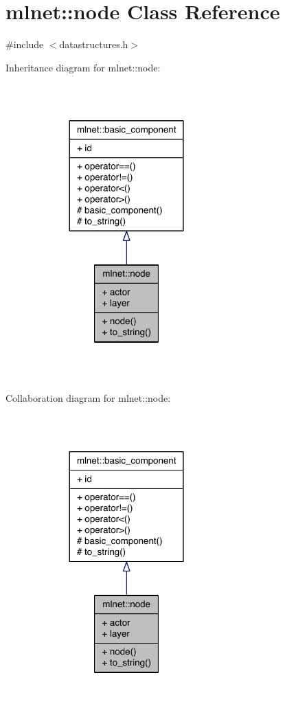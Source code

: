 \hypertarget{classmlnet_1_1node}{\section{mlnet\+:\+:node Class Reference}
\label{classmlnet_1_1node}
}


{\ttfamily \#include $<$datastructures.\+h$>$}



Inheritance diagram for mlnet\+:\+:node\+:\nopagebreak
\begin{figure}[H]
\begin{center}
\leavevmode
\includegraphics[width=204pt]{classmlnet_1_1node__inherit__graph}
\end{center}
\end{figure}


Collaboration diagram for mlnet\+:\+:node\+:\nopagebreak
\begin{figure}[H]
\begin{center}
\leavevmode
\includegraphics[width=204pt]{classmlnet_1_1node__coll__graph}
\end{center}
\end{figure}
